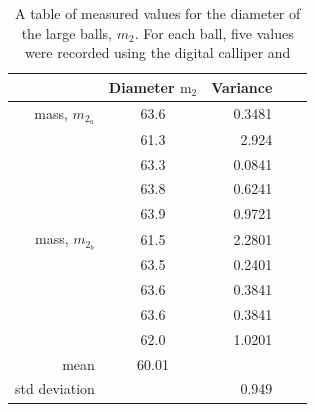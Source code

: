 \documentclass[12pt]{article}
\begin{document}
\begin{center}
\begin{table}[H]
\centering
\begin{tabular}{| r | c | r  | c  | | r  | } 
\hline


& Diameter $\mathrm{m_{2}}$ & Variance  \\
\hline
mass, $m_{2_{a}}$ & 63.6 & 0.3481  \\
& 61.3 & 2.924 \\
& 63.3 & 0.0841 \\
& 63.8 & 0.6241 \\
& 63.9 & 0.9721 \\
\hline
mass, $m_{2_{b}}$  & 61.5 & 2.2801 \\
& 63.5 & 0.2401 \\
& 63.6 & 0.3841 \\
& 63.6 &  0.3841 \\
& 62.0 & 1.0201 \\
\hline 
mean & 60.01 &  \\
\hline
std deviation & & 0.949 \\
\hline
\end{tabular}
\caption{A table of measured values for the diameter of the large balls, $m_{2}$. For each ball, five values were recorded using the digital calliper and  }
\end{table}%

\end{center}
\end{document}
